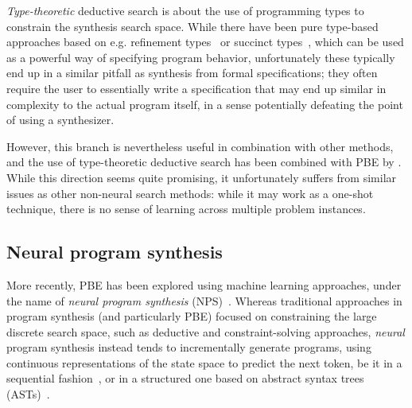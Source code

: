 \documentclass{article}
\begin{document}

\emph{Type-theoretic} deductive search is about the use of programming
types to constrain the synthesis search space.
While there have been pure type-based approaches based on e.g.
refinement types~\citep{synquid} or succinct types~\citep{guospeeding},
which can be used as a powerful way of specifying program behavior,
unfortunately these typically end up in a similar pitfall as
synthesis from formal specifications;
they often require the user to essentially write a specification
that may end up similar in complexity to the actual program itself,
in a sense potentially defeating the point of using a synthesizer.


However, this branch is nevertheless useful in combination with other methods,
and the use of type-theoretic deductive search has been combined with PBE by \citet{myth}.
While this direction seems quite promising,
it unfortunately suffers from similar issues as other non-neural search methods:
while it may work as a one-shot technique,
there is no sense of learning across multiple problem instances.

\subsection{Neural program synthesis}

More recently, PBE has been explored using machine learning approaches, under the name of \emph{neural program synthesis} (NPS)~\citep{nps}.
Whereas traditional approaches in program synthesis (and particularly PBE) focused on constraining the large discrete search space,
such as deductive and constraint-solving approaches,
\emph{neural} program synthesis instead tends to incrementally generate programs,
using continuous representations of the state space to predict the next token,
be it in a sequential fashion~\citep{npi,neuralmachinetranslation,alphanpi},
or in a structured one based on abstract syntax trees (ASTs)~\citep{nsps}.
\end{document}
